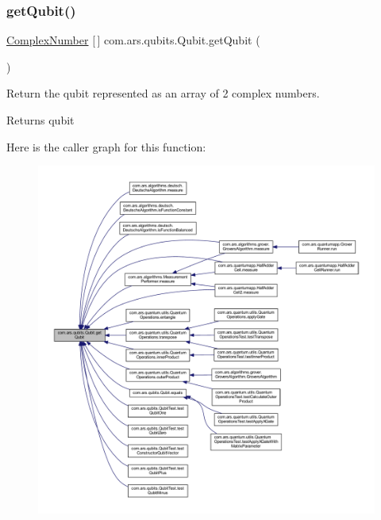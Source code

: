 \subsubsection{\texorpdfstring{get\+Qubit()}{getQubit()}}
{\footnotesize\ttfamily \hyperlink{classcom_1_1ars_1_1complexnumbers_1_1_complex_number}{Complex\+Number} \mbox{[}$\,$\mbox{]} com.\+ars.\+qubits.\+Qubit.\+get\+Qubit (\begin{DoxyParamCaption}{ }\end{DoxyParamCaption})}

Return the qubit represented as an array of 2 complex numbers. \begin{DoxyReturn}{Returns}
qubit 
\end{DoxyReturn}
Here is the caller graph for this function\+:
\nopagebreak
\begin{figure}[H]
\begin{center}
\leavevmode
\includegraphics[width=350pt]{classcom_1_1ars_1_1qubits_1_1_qubit_a48b2de0bf6b0efc8470d687a239085db_icgraph}
\end{center}
\end{figure}
\hypertarget{classcom_1_1ars_1_1qubits_1_1_qubit_acc34d826407f3aba4d09c3073d9d7270}{}\label{classcom_1_1ars_1_1qubits_1_1_qubit_acc34d826407f3aba4d09c3073d9d7270} 

